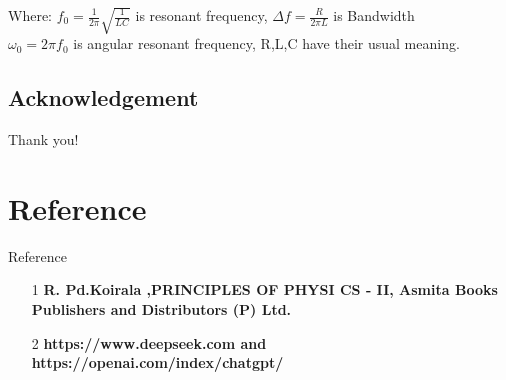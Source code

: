 \documentclass{beamer}
\begin{document}
\begin{frame}

Where: $f_0= \frac{1}{2\pi}\sqrt{\frac{1}{LC}}$ is resonant frequency, $\Delta f=\frac{R}{2\pi L} $ is Bandwidth\\
$\omega_0=2\pi f_0$ is angular resonant frequency, R,L,C have their usual meaning.
\vspace{1cm}

\end{frame}

\begin{frame}
\section*{Acknowledgement}
\begin{center}
\textcolor{myNewColorC}{\Huge{\centerline{Thank you!}}}
\end{center}

\end{frame}

\section*{Reference}  
\begin{frame}{Reference}
\scriptsize


\begin{itemize}
\item[1]\textbf{R. Pd.Koirala ,PRINCIPLES OF
PHYSI CS - II, Asmita Books Publishers and Distributors (P) Ltd.}
\item[2] \textbf{https://www.deepseek.com and https://openai.com/index/chatgpt/}

\end{itemize}
\end{frame}
\end{document}
